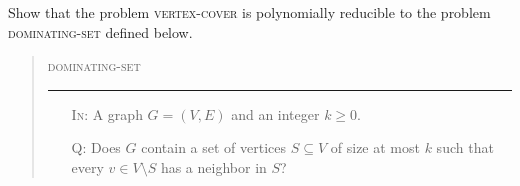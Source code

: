\documentclass[a4paper,12pt]{amsart}
\begin{document}
        
        \medskip\begin{problem}
        Show that the problem \textsc{vertex-cover} is polynomially reducible to the problem \textsc{dominating-set} defined below.
        
        \bigskip
        \begin{quote}
        \begin{mdframed}
        \textsc{dominating-set}
        \medskip\hrule\medskip
        \begin{itemize}
            \item[\textsc{In:}] A graph $G=(V,E)$ and an integer $k\geq 0$.
            \item[\textsc{Q:}] Does $G$ contain a set of vertices $S\subseteq V$ of size at most $k$ such that every $v\in V\setminus S$ has a neighbor in $S$?
        \end{itemize}
        \end{mdframed}
        \end{quote}
        
        
        \end{problem}
        
\end{document}
